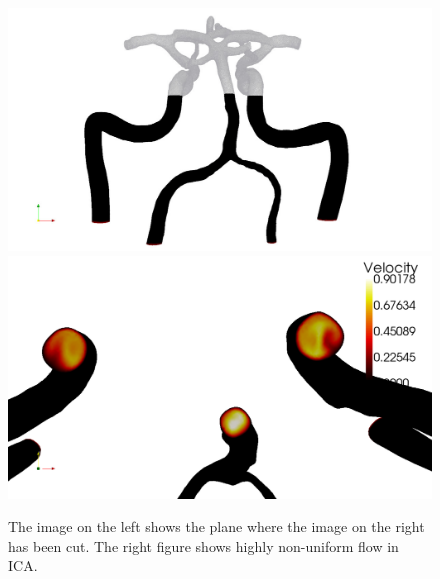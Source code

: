 \begin{figure}
  \begin{center}
    \includegraphics[width=\largefig]{chapters/kvs-2/pdf/cok_slice.pdf} \\
    \includegraphics[width=\largefig]{chapters/kvs-2/pdf/cok_ica_vel_peak_syst.pdf}
    \caption{The image on the left shows the plane where the image on
      the right has been cut.  The right figure shows highly
      non-uniform flow in ICA.}
    \label{fig:kvs-2:cok_ica}
  \end{center}
\end{figure}

%
